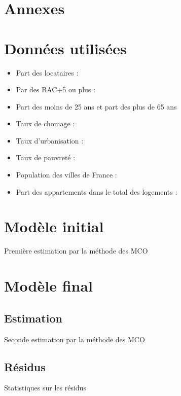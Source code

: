 \documentclass[12pt]{article}
\begin{document}
\section{Annexes}
\appendix
\section{Données utilisées}
\begin{itemize}
    \item Part des locataires : \cite{locataire}
    \item Par des BAC+5 ou plus : \cite{dipsup}
    \item Part des moins de 25 ans et part des plus de 65 ans \cite{jeune_persagee}
    \item Taux de chomage : \cite{chomage}
    \item Taux d'urbanisation : \cite{urba}
    \item Taux de pauvreté : \cite{pauvrete}
    \item Population des villes de France : \cite{ville}
    \item Part des appartements dans le total des logements : \cite{appart}
\end{itemize}
\section{Modèle initial}
\begin{table}[H]
    \caption{Première estimation par la méthode des MCO}
    \centering
\end{table}
\section{Modèle final}
\subsection{Estimation}
\begin{table}[H]
    \caption{Seconde estimation par la méthode des MCO}
    \centering
\end{table}
\subsection{Résidus}\label{appendix:erreurs}
\begin{table}[H]
    \caption{Statistiques sur les résidus}
    \centering
\end{table}
\end{document}
